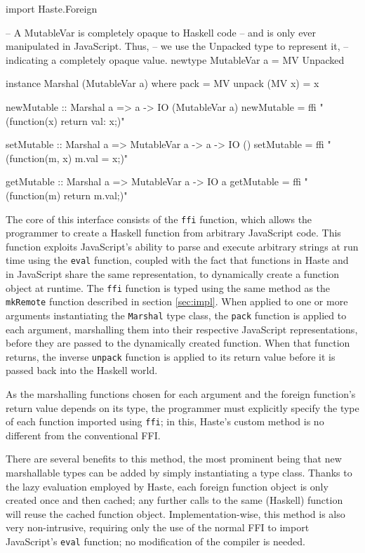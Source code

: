 \documentclass[preprint]{sigplanconf}
\begin{document}
\begin{listingfloat}
\begin{code}
import Haste.Foreign

-- A MutableVar is completely opaque to Haskell code
-- and is only ever manipulated in JavaScript. Thus,
-- we use the Unpacked type to represent it,
-- indicating a completely opaque value.
newtype MutableVar a = MV Unpacked

instance Marshal (MutableVar a) where
  pack          = MV
  unpack (MV x) = x

newMutable :: Marshal a => a -> IO (MutableVar a)
newMutable = ffi "(function(x) {return {val: x};})"

setMutable :: Marshal a => MutableVar a -> a -> IO ()
setMutable = ffi "(function(m, x) {m.val = x;})"

getMutable :: Marshal a => MutableVar a -> IO a
getMutable = ffi "(function(m) {return m.val;})"
\end{code}
\caption{Mutable variables with \lstinline!Haste.Foreign!}
\label{lst:ffi}
\end{listingfloat}

The core of this interface consists of the \lstinline!ffi! function, which
allows the programmer to create a Haskell function from arbitrary JavaScript
code. This function exploits JavaScript's ability to parse and execute
arbitrary strings at run time using the \lstinline!eval! function, coupled with
the fact that functions in Haste and in JavaScript share the same
representation, to dynamically create a function object at runtime.
The \lstinline!ffi! function is typed using the same method as the
\lstinline!mkRemote! function described in section \ref{sec:impl}.
When applied to one or more arguments instantiating the \lstinline!Marshal!
type class, the \lstinline!pack! function is applied to each argument,
marshalling them into their respective JavaScript representations, before they
are passed to the dynamically created function. When that function returns,
the inverse \lstinline!unpack! function is applied to its return value before
it is passed back into the Haskell world.

As the marshalling functions chosen for each argument and the foreign
function's return value depends on its type, the programmer must explicitly
specify the type of each function imported using \lstinline!ffi!; in this,
Haste's custom method is no different from the conventional FFI.

There are several benefits to this method, the most prominent being that new
marshallable types can be added by simply instantiating a type class. Thanks
to the lazy evaluation employed by Haste, each foreign function object is only
created once and then cached; any further calls to the same (Haskell) function
will reuse the cached function object. Implementation-wise, this method is also
very non-intrusive, requiring only the use of the normal FFI to import
JavaScript's \lstinline!eval! function; no modification of the compiler is
needed.
\end{document}
